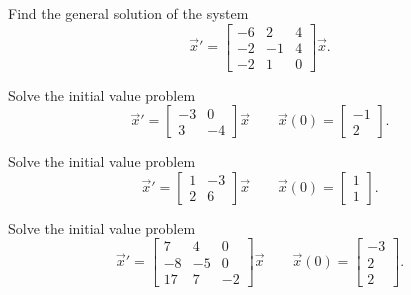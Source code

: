 \begin{exercise}\ansMark%
Find the general solution of the system
\begin{equation*}
{\vec{x}}' = \begin{bmatrix} -6 & 2 & 4 \\ -2 & -1 & 4 \\ -2 & 1 & 0 \end{bmatrix} \vec{x}.
\end{equation*}
\end{exercise}
%

\begin{exercise}
Solve the initial value problem
\[ {\vec{x}}' = \begin{bmatrix} -3 & 0 \\ 3 & -4 \end{bmatrix} \vec{x} \qquad \vec{x}(0) = \begin{bmatrix} -1 \\ 2 \end{bmatrix}. \]
\end{exercise}

\begin{exercise}
Solve the initial value problem
\[ {\vec{x}}' = \begin{bmatrix} 1 & -3 \\ 2 & 6 \end{bmatrix} \vec{x} \qquad \vec{x}(0) = \begin{bmatrix} 1 \\ 1 \end{bmatrix}. \]
\end{exercise}

\begin{exercise}
Solve the initial value problem
\[ {\vec{x}}' = \begin{bmatrix} 7 & 4 & 0 \\ -8 & -5 & 0 \\ 17 & 7 & -2 \end{bmatrix} \vec{x} \qquad \vec{x}(0) = \begin{bmatrix} -3 \\ 2 \\ 2 \end{bmatrix}. \]
\end{exercise}


\setcounter{exercise}{100}












